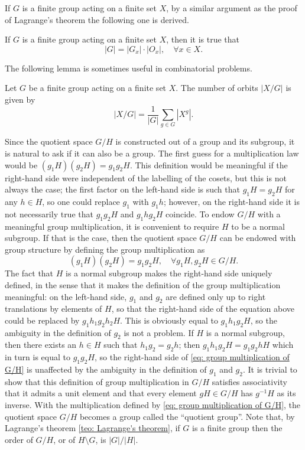 If $G$ is a finite group acting on a finite set $X$, by a similar argument as the proof of Lagrange's theorem the following one is derived.
\begin{teo}
    If $G$ is a finite group acting on a finite set $X$, then it is true that
    \begin{equation}
        |G| = |G_x|\cdot |O_x|,\quad \forall x \in X.   
    \end{equation}
\end{teo}
The following lemma is sometimes useful in combinatorial problems.
\begin{lem}
    Let $G$ be a finite group acting on a finite set $X$. The number of orbits $|X/G|$ is given by
    \begin{equation}
        |X/G| = \frac{1}{|G|}\sum_{g \in G}|X^g|.
    \end{equation}
\end{lem}
Since the quotient space $G/H$ is constructed out of a group and its subgroup, it is natural to ask if it can also be a group. The first guess for a multiplication law would be $(g_1H)(g_2H) = g_1g_2H$. This definition would be meaningful if the right-hand side were independent of the labelling of the cosets, but this is not always the case; the first factor on the left-hand side is such that $g_1H = g_2H$ for any $h \in H$, so one could replace $g_1$ with $g_1h$; however, on the right-hand side it is not necessarily true that $g_1g_2H$ and $g_1hg_2H$ coincide. To endow $G/H$ with a meaningful group multiplication, it is convenient to require $H$ to be a normal subgroup. If that is the case, then the quotient space $G/H$ can be endowed with group structure by defining the group multiplication as
\begin{equation}
\label{eq: group multiplication of G/H}
    (g_1H)(g_2H) = g_1g_2H,\quad \forall g_1H,g_2H \in G/H.
\end{equation}
The fact that $H$ is a normal subgroup makes the right-hand side uniquely defined, in the sense that it makes the definition of the group multiplication meaningful: on the left-hand side, $g_1$ and $g_2$ are defined only up to right translations by elements of $H$, so that the right-hand side of the equation above could be replaced by $g_1h_1g_2h_2H$. This is obviously equal to $g_1h_1g_2H$, so the ambiguity in the definition of $g_2$ is not a problem. If $H$ is a normal subgroup, then there exists an $h \in H$ such that $h_1g_2 = g_2h$; then $g_1h_1g_2H = g_1g_2hH$ which in turn is equal to $g_1g_2H$, so the right-hand side of \eqref{eq: group multiplication of G/H} is unaffected by the ambiguity in the definition of $g_1$ and $g_2$. It is trivial to show that this definition of group multiplication in $G/H$ satisfies associativity that it admits a unit element and that every element $gH \in G/H$ has $g^{-1}H$ as its inverse. With the multiplication defined by \eqref{eq: group multiplication of G/H}, the quotient space $G/H$ becomes a group called the ``quotient group''. Note that, by Lagrange's theorem \ref{teo: Lagrange's theorem}, if $G$ is a finite group then the order of $G/H$, or of $H \setminus G$, is $|G|/|H|$.
